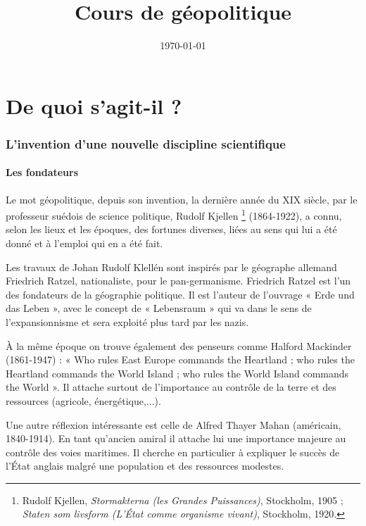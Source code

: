 \documentclass[a4paper,10pt]{article}
\title{\textbf{Cours de géopolitique}}
\date{\today}
\begin{document}
\maketitle

\tableofcontents

\newpage

\part{De quoi s'agit-il ?}

\section{L'invention d'une nouvelle discipline scientifique}

	\subsection{Les fondateurs}

		Le mot géopolitique, depuis son invention, la dernière année du XIX siècle, par le professeur suédois de science politique, Rudolf Kjellen
	\footnote{Rudolf Kjellen, \emph{Stormakterna (les Grandes Puissances)}, Stockholm, 1905 ; \emph{Staten som livsform (L’État comme organisme vivant)}, Stockholm, 1920.}
	(1864-1922), a connu, selon les lieux et les époques, des fortunes diverses, liées au sens qui lui a été donné et à l’emploi qui en a été fait.

		Les travaux de Johan Rudolf Klellén sont inspirés par le géographe allemand Friedrich Ratzel, nationaliste, pour le pan-germanisme.
		Friedrich Ratzel est l'un des fondateurs de la géographie politique.
		Il est l'auteur de l'ouvrage « Erde und das Leben », avec le concept de « Lebensraum » qui va dans le sens de l'expansionnisme et sera exploité plus tard par les nazis.

		À la même époque on trouve également des penseurs comme Halford Mackinder (1861-1947) : « Who rules East Europe commands the Heartland ; who rules the Heartland commands the World Island ; who rules the World Island commands the World ».
		Il attache surtout de l'importance au contrôle de la terre et des ressources (agricole, énergétique,...).

		Une autre réflexion intéressante est celle de Alfred Thayer Mahan (américain, 1840-1914).
		En tant qu'ancien amiral il attache lui une importance majeure au contrôle des voies maritimes.
		Il cherche en particulier à expliquer le succès de l'État anglais malgré une population et des ressources modestes.
\end{document}
